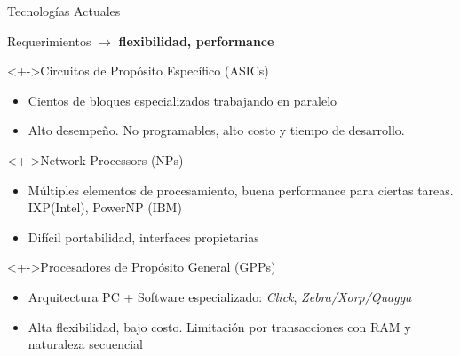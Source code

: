 \documentclass[xcolor=dvipsnames]{beamer}
\begin{document}
   
\begin {frame}{Tecnologías Actuales}   
  
  Requerimientos $\rightarrow$ {\bf flexibilidad, performance} 
  
  \begin{block}<+->{Circuitos de Propósito Específico (ASICs)} 
    \begin{itemize}
      \scriptsize
      \item Cientos de bloques especializados trabajando en paralelo
      \item Alto desempeño. No programables, alto costo y tiempo de desarrollo.
    \end{itemize}
  \end{block}

  \begin{block}<+->{Network Processors (NPs)}   
    \begin{itemize}
      \scriptsize
      \item Múltiples elementos de procesamiento, buena performance para ciertas tareas. IXP(Intel), PowerNP (IBM)
      \item Difícil portabilidad, interfaces propietarias
    \end{itemize}
  \end{block}

  \begin{block}<+->{Procesadores de Propósito General (GPPs)} 
    \begin{itemize}
      \scriptsize
      \item Arquitectura PC + Software especializado: \emph{Click}, \emph{Zebra/Xorp/Quagga}
      \item Alta flexibilidad, bajo costo. Limitación por transacciones con RAM y naturaleza secuencial
    \end{itemize}
  \end{block}
  
\end{frame}
\end{document}
